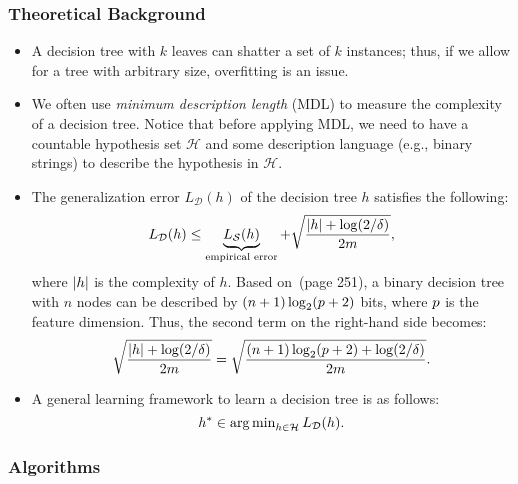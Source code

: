     \subsubsection{Theoretical Background}
    \begin{itemize}
        \item A decision tree with $k$ leaves can shatter a set of $k$ instances; thus, if we allow for a tree with arbitrary size, overfitting is an issue.
        \item We often use \emph{minimum description length} (MDL) to measure the complexity of a decision tree. Notice that before applying MDL, we need to have a countable hypothesis set $\mathcal{H}$ and some description language (e.g., binary strings) to describe the hypothesis in $\mathcal{H}$.
        \item The generalization error $L_\mathcal{D}(h)$ of the decision tree $h$ satisfies the following:
            \begin{equation}
                L_\mathcal{D}(h) \le \underbrace{L_\mathcal{S}(h)}_{\text{empirical error}} + \sqrt{\frac{| h | + \log(2/\delta)}{2m}},
            \end{equation}
        where $| h |$ is the complexity of $h$.
        Based on~\cite{shalev2014understanding}(page 251), a binary decision tree with $n$ nodes can be described by $(n+1)\log_2(p+2)$ bits, where $p$ is the feature dimension.
        Thus, the second term on the right-hand side becomes:
            \begin{equation}
                \sqrt{\frac{| h | + \log(2/\delta)}{2m}} = \sqrt{\frac{(n+1)\log_2(p+2) + \log(2/\delta)}{2m}}.
            \end{equation}
        \item A general learning framework to learn a decision tree is as follows:
            \begin{equation}
                h^\ast \in \operatorname{arg\,min}_{h \in \mathcal{H}} L_{\mathcal{D}}(h).
            \end{equation}
    \end{itemize}

    \subsubsection{Algorithms}
